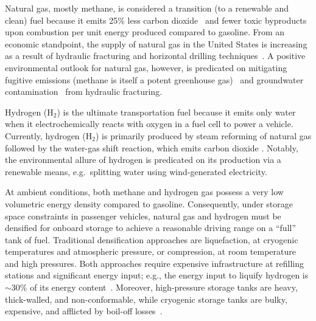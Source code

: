 \documentclass[twoside,twocolumn,9pt]{article}
\begin{document}
Natural gas, mostly methane, is considered a transition (to a renewable and
clean) fuel because it emits 25\% less carbon dioxide~\cite{eia2013much} and
fewer toxic byproducts~\cite{wang2000full} upon combustion per unit energy
produced compared to gasoline. From an economic standpoint, the supply of
natural gas in the United States is increasing as a result of hydraulic
fracturing and horizontal drilling techniques~\cite{usnatgassupply}. A positive
environmental outlook for natural gas, however, is predicated on mitigating
fugitive emissions (methane is itself a potent greenhouse
gas)~\cite{alvarez2012greater} and groundwater
contamination~\cite{osborn2011methane} from hydraulic fracturing.

Hydrogen (H$_2$) is the ultimate transportation fuel because it emits only
water when it electrochemically reacts with oxygen in a fuel cell to power a
vehicle. Currently, hydrogen (H$_2$) is primarily produced by steam reforming
of natural gas followed by the water-gas shift reaction, which emits carbon
dioxide \cite{crabtree2004hydrogen}. Notably, the environmental allure of
hydrogen is predicated on its production via a renewable means, e.g.\ splitting
water using wind-generated electricity.


At ambient conditions, both methane and hydrogen gas possess a very low
volumetric energy density compared to gasoline. Consequently, under storage
space constraints in passenger vehicles, natural gas and hydrogen must be
densified for onboard storage to achieve a reasonable driving range on a
``full'' tank of fuel. Traditional densification approaches are liquefaction,
at cryogenic temperatures and atmospheric pressure, or compression, at room
temperature and high pressures. Both approaches require expensive
infrastructure at refilling stations and significant energy input; e.g., the
energy input to liquify hydrogen is $\sim$30\% of its energy
content~\cite{bossel2003energy}. Moreover, high-pressure storage tanks are
heavy, thick-walled, and non-conformable, while cryogenic storage tanks are
bulky, expensive, and afflicted by boil-off losses~\cite{hasan2009minimizing}.
\end{document}

